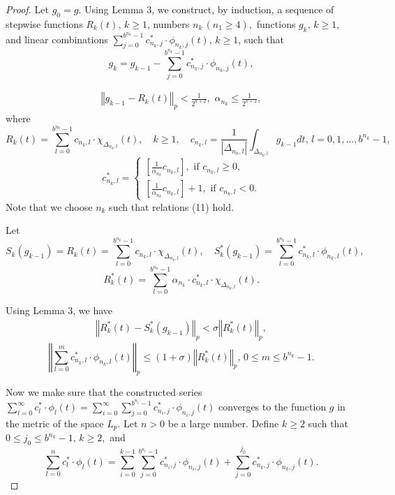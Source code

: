 \documentclass[
11pt,%
tightenlines,%
twoside,%
onecolumn,%
nofloats,%
nobibnotes,%
nofootinbib,%
superscriptaddress,%
noshowpacs,%
centertags]%
{revtex4}
\begin{document}
\begin{proof}
 Let  $ g_0=g $. Using Lemma 3, we
construct, by induction, a sequence of stepwise functions $
{R_k(t)}, \, k \ge 1 $, numbers $ {n_k} \, (n_1 \ge 4),$ functions
$ {g_k}, \, k \ge 1 $, and linear combinations  $
\sum_{j=0}^{b^{n_k}-1} c_{n_k,j}^{\ast} \cdot \phi_{n_k,j}(t),
\, k\ge 1 $, such that
\begin{equation*}
    g_k = g_{k-1} - \sum_{j=0}^{b^{n_k}-1} c_{n_k,j}^{\ast} \cdot \phi_{n_k,j}(t),
\end{equation*}

\begin{eqnarray}
    \left\Vert g_{k-1} - R_k (t) \right\Vert_p <\frac{1}{2^{k+2}},\,\,
    \alpha_{n_k}\le \frac{1}{2^{k+2}},
\end{eqnarray}
where
$$
R_k (t)= \sum_{l=0}^{b^{n_k}-1} c_{n_k,l} \cdot
\chi_{\Delta_{n_k,l}}(t),\quad
k\ge 1,
\quad
c_{n_k,l}=\frac{1}{\left| \Delta_{n_k,l}\right|
}\int_{\Delta_{n_k,l}}
g_{k-1}  dt, \, l=0,1,...,b^{n_k}-1,
$$
$$
c^{\ast}_{n_k,l}=\left\{\begin{array}{rcl}
\left[\frac{1}{\alpha_{n_k}} c_{n_k,l}\right], \mbox { if }
c_{n_k,l} \ge 0, \\
\left[\frac{1}{\alpha_{n_k}} c_{n_k,l}\right]+1, \mbox{ if }c_{n_k,l}<0 .
\end{array}
\right.
$$
Note that we choose $n_k$ such that relations (11) hold.

Let
$$
S_k\left( g_{k-1}\right) = R_k(t) = \sum_{l=0}^{b^{n_k}-1} c_{n_k,l}\cdot \chi_{{\Delta}_{n_k,l}}(t),\quad
S_k^{\ast} \left( g_{k-1}\right) =
\sum_{l=0}^{b^{n_k}-1} c^{\ast}_{n_k,l} \cdot \phi_{n_k,l}(t),
$$
$$
R_k^{\ast}(t) = \sum_{l=0}^{b^{n_k}-1} \alpha_{n_k}\cdot c_{n_k,l}^{\ast}\cdot \chi_{{\Delta}_{n_k,l}}(t).
$$

Using Lemma 3, we have
\begin{eqnarray}
    \left\Vert R_k^{\ast} (t) - S_k^{\ast}(g_{k-1})  \right\Vert_p
    <\sigma \left\Vert  R_k^{\ast} (t) \right\Vert_p,
\end{eqnarray}
$$
\left\Vert  \sum_{l=0}^{m} c^{\ast}_{n_k,l} \cdot \phi_{n_k,l}(t) \right\Vert_p \le(1+\sigma) \left\Vert  R_k^{\ast} (t) \right\Vert_p,\, 0\le m \le b^{n_k}-1.
$$

Now we make sure that the constructed series  $
\sum_{l=0}^{\infty} c^{\ast}_{l} \cdot \phi_{l}(t)=
\sum_{i=0}^{\infty} \sum_{j=0}^{b^{n_i}-1} c^{\ast}_{n_i,j} \cdot
\phi_{n_i,j}(t) $ converges to the function $ g $ in the metric of
the space $ L_p $. Let $ n> 0 $ be a large number. Define $k\ge 2$
such that
$ 0\le j_0 \le b^{n_k}-1,\, k\ge 2,$ and
$$
\sum_{l=0}^{n} c^{\ast}_{l} \cdot \phi_{l}(t)= \sum_{i=0}^{k-1} \sum_{j=0}^{b^{n_i}-1} c^{\ast}_{n_i,j} \cdot \phi_{n_i,j}(t) +
\sum_{j=0}^{j_0} c^{\ast}_{n_k,j} \cdot \phi_{n_k,j}(t).
$$


\end{proof}
\end{document}
